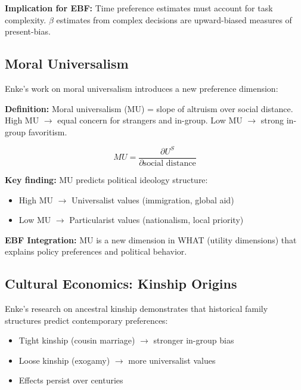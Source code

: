 \textbf{Implication for EBF:} Time preference estimates must account for
task complexity. $\beta$ estimates from complex decisions are upward-biased
measures of present-bias.

\subsection{Moral Universalism}
\label{sec:enk-mu}

Enke's work on moral universalism \citep{enke2019moral, enke2022universalism,
enke2025universalism} introduces a new preference dimension:

\textbf{Definition:} Moral universalism (MU) = slope of altruism over social
distance. High MU $\rightarrow$ equal concern for strangers and in-group.
Low MU $\rightarrow$ strong in-group favoritism.

\begin{equation}
MU = \frac{\partial U^S}{\partial \text{social distance}}
\end{equation}

\textbf{Key finding:} MU predicts political ideology structure:
\begin{itemize}[nosep]
    \item High MU $\rightarrow$ Universalist values (immigration, global aid)
    \item Low MU $\rightarrow$ Particularist values (nationalism, local priority)
\end{itemize}

\textbf{EBF Integration:} MU is a new dimension in WHAT (utility dimensions)
that explains policy preferences and political behavior.

\subsection{Cultural Economics: Kinship Origins}
\label{sec:enk-kinship}

Enke's research on ancestral kinship \citep{enke2017ancestral, enke2021ancestral_env}
demonstrates that historical family structures predict contemporary preferences:

\begin{itemize}[nosep]
    \item Tight kinship (cousin marriage) $\rightarrow$ stronger in-group bias
    \item Loose kinship (exogamy) $\rightarrow$ more universalist values
    \item Effects persist over centuries
\end{itemize}

